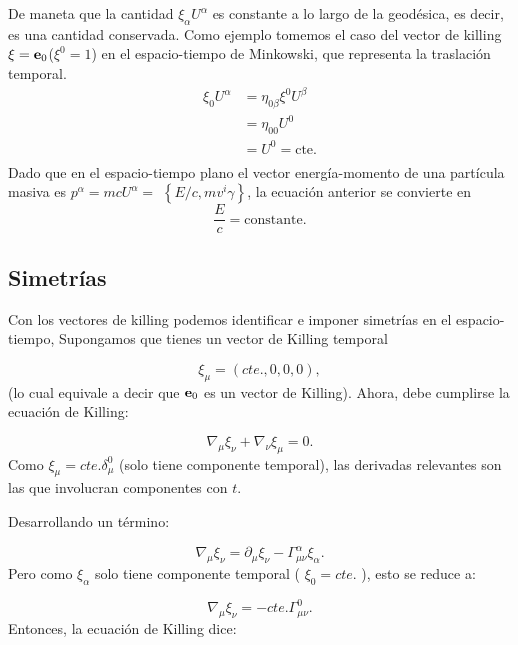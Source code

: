 De maneta que la cantidad $\xi_\alpha U^\alpha$ es constante a lo largo de la geodésica, es decir, es una cantidad conservada.
Como ejemplo tomemos el caso del vector de killing $\mathbf{\xi} = \mathbf{e}_0$($\xi^0 =1$) en el espacio-tiempo de Minkowski, que representa la traslación temporal.
\begin{equation}
    \begin{aligned}
        \xi_0 U^\alpha & = \eta_{0 \beta} \xi^0 U^\beta \\
                       & = \eta_{0 0 } U^0              \\
                       & = U^0 = \text{cte.}            \\
    \end{aligned}
\end{equation}
Dado que en el espacio-tiempo plano el vector energía-momento de una partícula masiva es $p^\alpha=m c U^\alpha=$ $\left\{E / c, m v^i \gamma\right\}$, la ecuación anterior se convierte en
\[
    \frac{E}{c}=\text{constante}.
\]


\subsection{Simetrías }
\label{subsec:simetria}
Con los  vectores de killing podemos identificar e imponer simetrías en el espacio-tiempo,
Supongamos que tienes un vector de Killing temporal

\begin{equation}
    \xi_\mu=(cte.,0,0,0),
\end{equation}
(lo cual equivale a decir que $\mathbf{e}_0$ es un vector de Killing).
Ahora, debe cumplirse la ecuación de Killing:

\begin{equation}
    \nabla_\mu \xi_\nu+\nabla_\nu \xi_\mu=0.
\end{equation}
Como $\xi_\mu=cte. \delta_\mu^0$ (solo tiene componente temporal), las derivadas relevantes son las que involucran componentes con $t$.

Desarrollando un término:

\begin{equation}
    \nabla_\mu \xi_\nu=\partial_\mu \xi_\nu-\Gamma_{\mu \nu}^\alpha \xi_\alpha.
\end{equation}
Pero como $\xi_\alpha$ solo tiene componente temporal ( $\xi_0=cte.$ ), esto se reduce a:

\begin{equation}
    \nabla_\mu \xi_\nu=-cte.\Gamma_{\mu \nu}^0   .
\end{equation}
Entonces, la ecuación de Killing dice:


